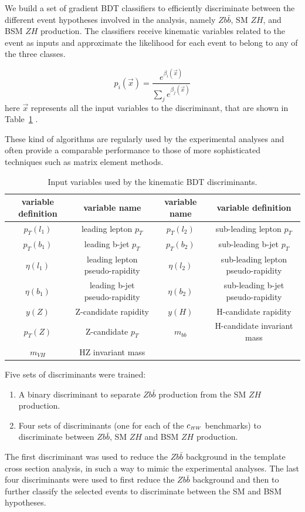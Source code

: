 We build a set of gradient BDT classifiers to efficiently discriminate
between the different event hypotheses involved in the analysis, namely $Z b\bar{b}$,
SM $Z H$, and BSM $Z H$ production. 
The classifiers receive kinematic variables related to the event as inputs and approximate
the likelihood for each event to belong to any of the three classes.

\begin{equation}
p_{i}(\vec x) = \frac{ e^{\beta_{i}(\vec x) } }{ \sum_j e^{\beta_{j}(\vec x) } }
\end{equation}
here $\vec x$ represents all the input variables to the discriminant, that are shown in Table~\ref{tab:bdt_features} .

These kind of algorithms are regularly used by the experimental analyses and often provide a comparable performance to those of more sophisticated techniques such as matrix element methods. 
%
\begin{table}[h!]
\centering
\begin{tabular}{||c|c||c|c||}
variable definition & variable name &  variable name & variable definition \\
\hline
$p_T(l_1)$ & leading lepton $p_T$ & $p_T(l_2)$ & sub-leading lepton $p_T$\\
$p_T(b_1)$ & leading b-jet $p_T$ & $p_T(b_2)$ & sub-leading b-jet $p_T$\\
$\eta(l_1)$ & leading lepton pseudo-rapidity & $\eta(l_2)$ & sub-leading lepton pseudo-rapidity\\
$\eta(b_1)$ & leading b-jet pseudo-rapidity  & $\eta(b_2)$ & sub-leading b-jet  pseudo-rapidity\\
$y(Z)$ & Z-candidate rapidity  & $y(H)$ & H-candidate rapidity \\
$p_T(Z)$ & Z-candidate $p_T$  & $m_{bb}$ & H-candidate invariant mass \\
$m_{VH}$ & HZ invariant mass  &  &  \\
\end{tabular}
\caption{
\label{tab:bdt_features}
Input variables used by the kinematic BDT discriminants.
}
\end{table}

Five sets of discriminants were trained:
\begin{enumerate}
\item A binary discriminant to separate $Z b\bar{b}$ production from the SM $Z H$ production.
\item Four sets of  discriminants (one for each of the $c_{\scriptscriptstyle HW}$ benchmarks) to
    discriminate between $Z b\bar{b}$, SM $Z H$ and BSM $Z H$ production.
\end{enumerate}
The first discriminant was used to reduce the $Z b\bar{b}$ background in the template
cross section analysis, in such a way to mimic the experimental analyses.
The last four discriminants were used to first reduce the $Z b\bar{b}$ background and then to further classify the selected events to discriminate between the SM and BSM hypotheses.

